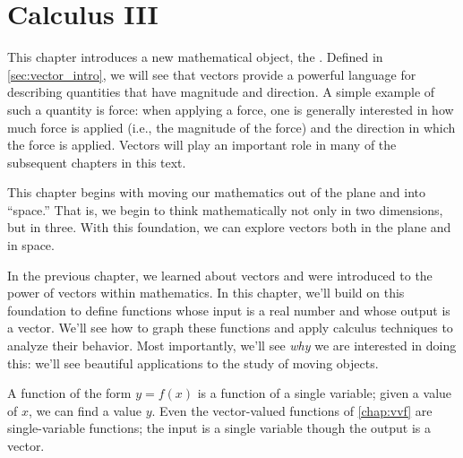 \part{Calculus III}



This chapter introduces a new mathematical object, the . Defined in \autoref{sec:vector_intro}, we will see that vectors provide a powerful language for describing quantities that have magnitude and direction. A simple example of such a quantity is force: when applying a force, one is generally interested in how much force is applied (i.e., the magnitude of the force) and the direction in which the force is applied. Vectors will play an important role in many of the subsequent chapters in this text. 

This chapter begins with moving our mathematics out of the plane and into ``space.'' That is, we begin to think mathematically not only in two dimensions, but in three. With this foundation, we can explore vectors both in the plane and in space. 







%



In the previous chapter, we learned about vectors and were introduced to the power of vectors within mathematics. In this chapter, we'll build on this foundation to define functions whose input is a real number and whose output is a vector. We'll see how to graph these functions and apply calculus techniques to analyze their behavior. Most importantly, we'll see \textit{why} we are interested in doing this: we'll see beautiful applications to the study of moving objects.









A function of the form $y=f(x)$ is a function of a single variable; given a value of $x$, we can find a value $y$. Even the vector-valued functions of \autoref{chap:vvf} are single-variable functions; the input is a single variable though the output is a vector.

